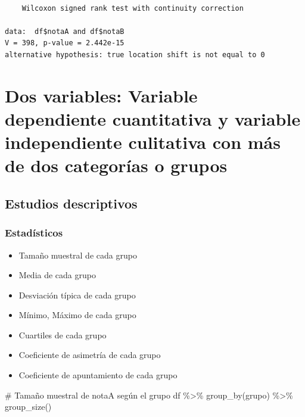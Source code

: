 \documentclass[
  spanish,
  a4paper,
]{scrreport}
\newenvironment{Shaded}{\begin{snugshade}}{\end{snugshade}}
\newcommand{\CommentTok}[1]{\textcolor[rgb]{0.37,0.37,0.37}{#1}}
\newcommand{\FunctionTok}[1]{\textcolor[rgb]{0.28,0.35,0.67}{#1}}
\newcommand{\NormalTok}[1]{\textcolor[rgb]{0.00,0.23,0.31}{#1}}
\newcommand{\SpecialCharTok}[1]{\textcolor[rgb]{0.37,0.37,0.37}{#1}}
\providecommand{\tightlist}{%
  \setlength{\itemsep}{0pt}\setlength{\parskip}{0pt}}
\theoremstyle{definition}
\theoremstyle{definition}
\theoremstyle{remark}
\begin{document}
\begin{verbatim}

    Wilcoxon signed rank test with continuity correction

data:  df$notaA and df$notaB
V = 398, p-value = 2.442e-15
alternative hypothesis: true location shift is not equal to 0
\end{verbatim}

\section{Dos variables: Variable dependiente cuantitativa y variable
independiente culitativa con más de dos categorías o
grupos}\label{dos-variables-variable-dependiente-cuantitativa-y-variable-independiente-culitativa-con-muxe1s-de-dos-categoruxedas-o-grupos}

\subsection{Estudios descriptivos}\label{estudios-descriptivos-4}

\subsubsection{Estadísticos}\label{estaduxedsticos-4}

\begin{itemize}
\tightlist
\item
  Tamaño muestral de cada grupo
\item
  Media de cada grupo
\item
  Desviación típica de cada grupo
\item
  Mínimo, Máximo de cada grupo
\item
  Cuartiles de cada grupo
\item
  Coeficiente de asimetría de cada grupo
\item
  Coeficiente de apuntamiento de cada grupo
\end{itemize}

\begin{Shaded}
\begin{Highlighting}[]
\CommentTok{\# Tamaño muestral de notaA según el grupo}
\NormalTok{df }\SpecialCharTok{\%\textgreater{}\%} \FunctionTok{group\_by}\NormalTok{(grupo) }\SpecialCharTok{\%\textgreater{}\%} \FunctionTok{group\_size}\NormalTok{()}
\end{Highlighting}
\end{Shaded}
\end{document}
